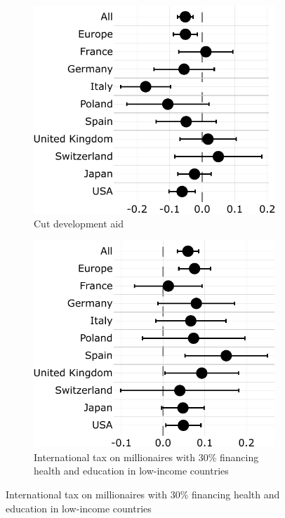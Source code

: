 \documentclass[12pt,english]{article}
\begin{document}
\begin{bibunit}
\begin{figure}
\begin{subfigure}{.49\textwidth}
  \caption[]{Cut development aid}
  \includegraphics[height=.36\textheight]{../figures/country_comparison/program_preferred_by_cut_aid_in_program.pdf}
\end{subfigure} 
\begin{subfigure}{.49\textwidth}
  \caption[]{International tax on millionaires with 30\% financing health and education in low-income countries}%
  \includegraphics[height=.36\textheight]{../figures/country_comparison/program_preferred_by_millionaire_tax_in_program.pdf}%

\end{subfigure}
\end{figure}
\end{bibunit}
\end{document}
